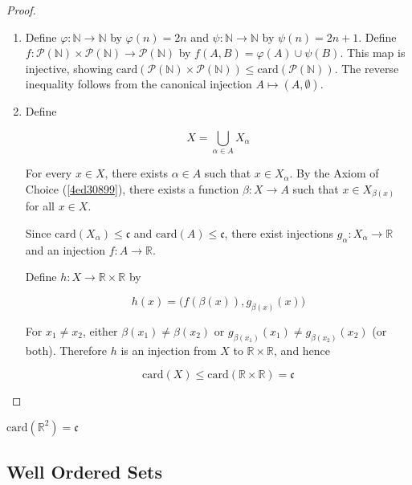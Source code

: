 \begin{proof}
    \begin{enumerate}
        \item  Define $\varphi: \mathbb{N} \to \mathbb{N}$ by $\varphi(n) = 2n$ and $\psi: \mathbb{N} \to \mathbb{N}$ by $\psi(n) = 2n + 1$.
    Define $f: \mathcal{P}(\mathbb{N}) \times \mathcal{P}(\mathbb{N}) \to \mathcal{P}(\mathbb{N})$ by $f(A, B) = \varphi(A) \cup \psi(B)$.
    This map is injective, showing $\mathrm{card}(\mathcal{P}(\mathbb{N}) \times \mathcal{P}(\mathbb{N})) \le \mathrm{card}(\mathcal{P}(\mathbb{N}))$.
    The reverse inequality follows from the canonical injection $A \mapsto (A, \emptyset)$.

        \item Define

        \[
            X = \bigcup_{\alpha \in A}X_{\alpha}
        \]

        For every $x \in X$, there exists $\alpha \in A$ such that $x \in X_{\alpha}$. By the Axiom of Choice (\cref{4ed30899}),
        there exists a function $\beta: X \to A$ such that $x \in X_{\beta(x)}$ for all $x \in X$.

        Since $\mathrm{card}(X_{\alpha}) \le \mathfrak{c}$ and $\mathrm{card}(A) \le \mathfrak{c}$, there exist injections $g_{\alpha}: X_{\alpha} \to \mathbb{R}$
        and an injection $f: A \to \mathbb{R}$.

        Define $h: X \to \mathbb{R} \times \mathbb{R}$ by

        \[
            h(x) = \big( f(\beta(x)), g_{\beta(x)}(x) \big)
        \]

        For $x_1 \ne x_2$, either $\beta(x_1) \ne \beta(x_2)$ or $g_{\beta(x_1)}(x_1) \ne g_{\beta(x_2)}(x_2)$ (or both).
        Therefore $h$ is an injection from $X$ to $\mathbb{R} \times \mathbb{R}$, and hence

        \[
            \mathrm{card}(X) \le \mathrm{card}(\mathbb{R} \times \mathbb{R}) = \mathfrak{c}
        \]
    \end{enumerate}
\end{proof}

\begin{corollary}
    $\mathrm{card}(\mathbb{R}^2) = \mathfrak{c}$
\end{corollary}

\subsection{Well Ordered Sets}

